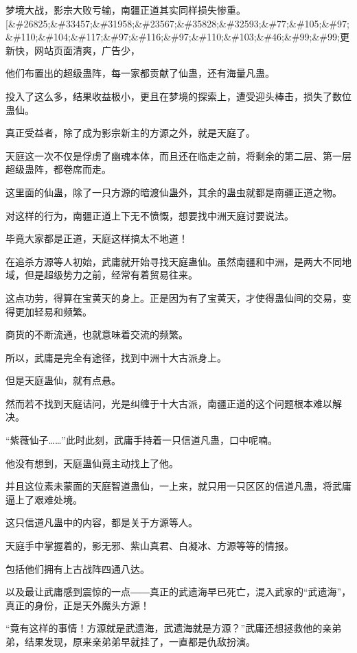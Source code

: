 
\begin{this_body}

梦境大战，影宗大败亏输，南疆正道其实同样损失惨重。[\&\#26825;\&\#33457;\&\#31958;\&\#23567;\&\#35828;\&\#32593;\&\#77;\&\#105;\&\#97;\&\#110;\&\#104;\&\#117;\&\#97;\&\#116;\&\#97;\&\#110;\&\#103;\&\#46;\&\#99;\&\#99;更新快，网站页面清爽，广告少，

他们布置出的超级蛊阵，每一家都贡献了仙蛊，还有海量凡蛊。

投入了这么多，结果收益极小，更且在梦境的探索上，遭受迎头棒击，损失了数位蛊仙。

真正受益者，除了成为影宗新主的方源之外，就是天庭了。

天庭这一次不仅是俘虏了幽魂本体，而且还在临走之前，将剩余的第二层、第一层超级蛊阵，都卷席而走。

这里面的仙蛊，除了一只方源的暗渡仙蛊外，其余的蛊虫就都是南疆正道之物。

对这样的行为，南疆正道上下无不愤慨，想要找中洲天庭讨要说法。

毕竟大家都是正道，天庭这样搞太不地道！

在追杀方源等人初始，武庸就开始寻找天庭蛊仙。虽然南疆和中洲，是两大不同地域，但是超级势力之前，经常有着贸易往来。

这点功劳，得算在宝黄天的身上。正是因为有了宝黄天，才使得蛊仙间的交易，变得更加轻易和频繁。

商货的不断流通，也就意味着交流的频繁。

所以，武庸是完全有途径，找到中洲十大古派身上。

但是天庭蛊仙，就有点悬。

然而若不找到天庭诘问，光是纠缠于十大古派，南疆正道的这个问题根本难以解决。

“紫薇仙子……”此时此刻，武庸手持着一只信道凡蛊，口中呢喃。

他没有想到，天庭蛊仙竟主动找上了他。

并且这位素未蒙面的天庭智道蛊仙，一上来，就只用一只区区的信道凡蛊，将武庸逼上了艰难处境。

这只信道凡蛊中的内容，都是关于方源等人。

天庭手中掌握着的，影无邪、紫山真君、白凝冰、方源等等的情报。

包括他们拥有上古战阵四通八达。

以及最让武庸感到震惊的一点――真正的武遗海早已死亡，混入武家的“武遗海”，真正的身份，正是天外魔头方源！

“竟有这样的事情！方源就是武遗海，武遗海就是方源？”武庸还想拯救他的亲弟弟，结果发现，原来亲弟弟早就挂了，一直都是仇敌扮演。


\end{this_body}
